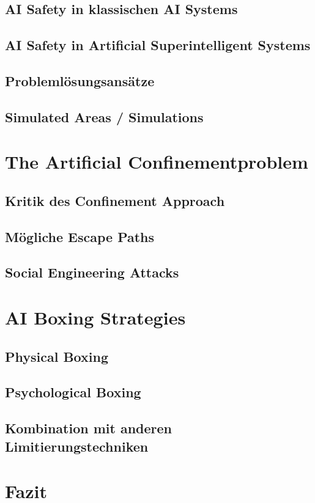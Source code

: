         \subsection{AI Safety in klassischen AI Systems}
        \subsection{AI Safety in Artificial Superintelligent Systems}

        \subsection{Problemlösungsansätze}
        \subsection{Simulated Areas / Simulations}
    \section{The Artificial Confinementproblem}
        \subsection{Kritik des Confinement Approach}
        \subsection{Mögliche Escape Paths}
        \subsection{Social Engineering Attacks}
    \section{AI Boxing Strategies}
        \subsection{Physical Boxing}
        \subsection{Psychological Boxing}
        \subsection{Kombination mit anderen Limitierungstechniken}
    \section{Fazit}

    \newpage
    
    

    \listoffigures


